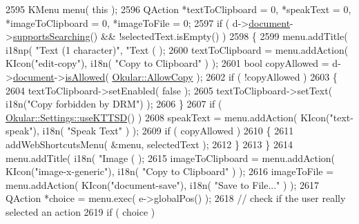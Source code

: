 \begin{DoxyCode}
2595             KMenu menu( \textcolor{keyword}{this} );
2596             QAction *textToClipboard = 0, *speakText = 0, *imageToClipboard = 0, *imageToFile = 0;
2597             \textcolor{keywordflow}{if} ( d->\hyperlink{classPageViewPrivate_a50645b9853306cffd74e51efb677e5b4}{document}->\hyperlink{classOkular_1_1Document_acadcf633db6332012dbbd1914fddd0c9}{supportsSearching}() && !selectedText.isEmpty() )
2598             \{
2599                 menu.addTitle( i18np( \textcolor{stringliteral}{"Text (1 character)"}, \textcolor{stringliteral}{"Text (%
       );
2600                 textToClipboard = menu.addAction( KIcon(\textcolor{stringliteral}{"edit-copy"}), i18n( \textcolor{stringliteral}{"Copy to Clipboard"} ) );
2601                 \textcolor{keywordtype}{bool} copyAllowed = d->\hyperlink{classPageViewPrivate_a50645b9853306cffd74e51efb677e5b4}{document}->\hyperlink{classOkular_1_1Document_a6dd7a475b14222c07d1c410311f35cdb}{isAllowed}( 
      \hyperlink{namespaceOkular_a3601f4e702453ddf1125476dd6e7577ba36a60050e67a446a5ff61aac6756718c}{Okular::AllowCopy} );
2602                 \textcolor{keywordflow}{if} ( !copyAllowed )
2603                 \{
2604                     textToClipboard->setEnabled( \textcolor{keyword}{false} );
2605                     textToClipboard->setText( i18n(\textcolor{stringliteral}{"Copy forbidden by DRM"}) );
2606                 \}
2607                 \textcolor{keywordflow}{if} ( \hyperlink{classOkular_1_1Settings_a165dd0c56407e353bda8a773fa1ad485}{Okular::Settings::useKTTSD}() )
2608                     speakText = menu.addAction( KIcon(\textcolor{stringliteral}{"text-speak"}), i18n( \textcolor{stringliteral}{"Speak Text"} ) );
2609                 \textcolor{keywordflow}{if} ( copyAllowed )
2610                 \{
2611                     addWebShortcutsMenu( &menu, selectedText );
2612                 \}
2613             \}
2614             menu.addTitle( i18n( \textcolor{stringliteral}{"Image (%
       );
2615             imageToClipboard = menu.addAction( KIcon(\textcolor{stringliteral}{"image-x-generic"}), i18n( \textcolor{stringliteral}{"Copy to Clipboard"} ) );
2616             imageToFile = menu.addAction( KIcon(\textcolor{stringliteral}{"document-save"}), i18n( \textcolor{stringliteral}{"Save to File..."} ) );
2617             QAction *choice = menu.exec( e->globalPos() );
2618             \textcolor{comment}{// check if the user really selected an action}
2619             \textcolor{keywordflow}{if} ( choice )
}}
\end{DoxyCode}
